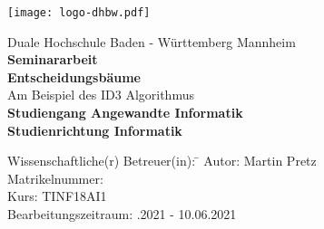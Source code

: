 \begin{titlepage}
    \begin{minipage}{\textwidth}
        \vspace{-0.5cm}
        \texttt{[image: logo-dhbw.pdf]}
    \end{minipage}
    \vspace{1em}

    \begin{center}
		{\textsf{\large Duale Hochschule Baden - W\"urttemberg Mannheim}}\\[4em]
		{\textsf{\textbf{\large{Seminararbeit}}}}\\[6mm]                                 %
		{\textsf{\textbf{\Large{Entscheidungsbäume}}}} \\[0.5cm]                        %
		{\textsf{Am Beispiel des ID3 Algorithmus}} \\[1.5cm]
		{\textsf{\textbf{\large{Studiengang Angewandte Informatik}}}}\\[6mm]
		{\textsf{\textbf{Studienrichtung Informatik}}}\vspace{12em}
		\begin{minipage}{\textwidth}
			\begin{tabbing}
				Wissenschaftliche(r) Betreuer(in): \hspace{0.85cm}\=\kill
				Autor: \> Martin Pretz \\[1.5mm]
				Matrikelnummer:  \\[1.5mm]
				Kurs: \> TINF18AI1 \\[1.5mm]
				Bearbeitungszeitraum: .2021 - 10.06.2021 \\[1.5mm]
			\end{tabbing}
		\end{minipage}
	\end{center}
\end{titlepage}